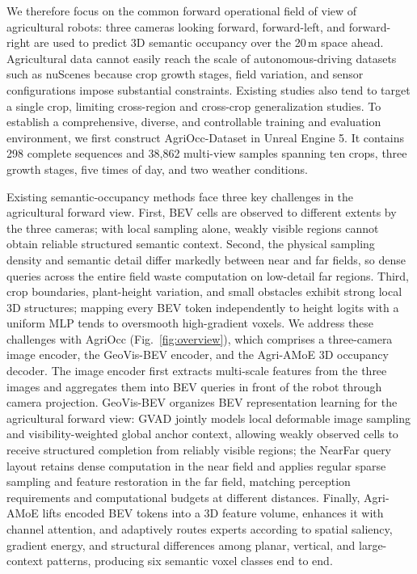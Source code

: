 \documentclass[a4paper,fleqn]{cas-sc}
\begin{document}
We therefore focus on the common forward operational field of view of agricultural robots: three cameras looking forward, forward-left, and forward-right are used to predict 3D semantic occupancy over the 20\,m space ahead. Agricultural data cannot easily reach the scale of autonomous-driving datasets such as nuScenes because crop growth stages, field variation, and sensor configurations impose substantial constraints. Existing studies also tend to target a single crop, limiting cross-region and cross-crop generalization studies. To establish a comprehensive, diverse, and controllable training and evaluation environment, we first construct AgriOcc-Dataset in Unreal Engine 5. It contains 298 complete sequences and 38,862 multi-view samples spanning ten crops, three growth stages, five times of day, and two weather conditions.

Existing semantic-occupancy methods face three key challenges in the agricultural forward view. First, BEV cells are observed to different extents by the three cameras; with local sampling alone, weakly visible regions cannot obtain reliable structured semantic context. Second, the physical sampling density and semantic detail differ markedly between near and far fields, so dense queries across the entire field waste computation on low-detail far regions. Third, crop boundaries, plant-height variation, and small obstacles exhibit strong local 3D structures; mapping every BEV token independently to height logits with a uniform MLP tends to oversmooth high-gradient voxels. We address these challenges with AgriOcc (Fig.~\ref{fig:overview}), which comprises a three-camera image encoder, the GeoVis-BEV encoder, and the Agri-AMoE 3D occupancy decoder. The image encoder first extracts multi-scale features from the three images and aggregates them into BEV queries in front of the robot through camera projection. GeoVis-BEV organizes BEV representation learning for the agricultural forward view: GVAD jointly models local deformable image sampling and visibility-weighted global anchor context, allowing weakly observed cells to receive structured completion from reliably visible regions; the NearFar query layout retains dense computation in the near field and applies regular sparse sampling and feature restoration in the far field, matching perception requirements and computational budgets at different distances. Finally, Agri-AMoE lifts encoded BEV tokens into a 3D feature volume, enhances it with channel attention, and adaptively routes experts according to spatial saliency, gradient energy, and structural differences among planar, vertical, and large-context patterns, producing six semantic voxel classes end to end.
\end{document}
